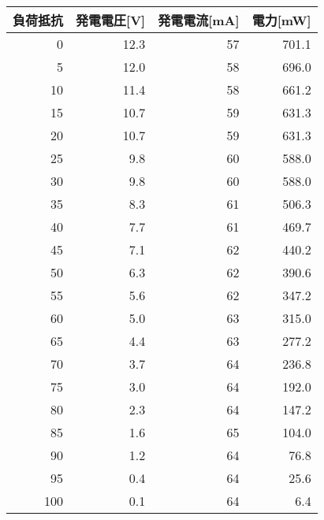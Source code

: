 \begin{tabular}{@{}rrrr@{}}
  \multicolumn{1}{c}{負荷抵抗} & \multicolumn{1}{c}{発電電圧{[}V{]}} & \multicolumn{1}{c}{発電電流{[}mA{]}} & \multicolumn{1}{c}{電力{[}mW{]}} \\ \midrule
  0   & 12.3 & 57 & 701.1\\
  5   & 12.0 & 58 & 696.0\\
  10  & 11.4 & 58 & 661.2\\
  15  & 10.7 & 59 & 631.3\\
  20  & 10.7 & 59 & 631.3\\
  25  & 9.8  & 60 & 588.0\\
  30  & 9.8  & 60 & 588.0\\
  35  & 8.3  & 61 & 506.3\\
  40  & 7.7  & 61 & 469.7\\
  45  & 7.1  & 62 & 440.2\\
  50  & 6.3  & 62 & 390.6\\
  55  & 5.6  & 62 & 347.2\\
  60  & 5.0  & 63 & 315.0\\
  65  & 4.4  & 63 & 277.2\\
  70  & 3.7  & 64 & 236.8\\
  75  & 3.0  & 64 & 192.0\\
  80  & 2.3  & 64 & 147.2\\
  85  & 1.6  & 65 & 104.0\\
  90  & 1.2  & 64 & 76.8 \\
  95  & 0.4  & 64 & 25.6 \\
  100 & 0.1  & 64 & 6.4  \\ \bottomrule
\end{tabular}